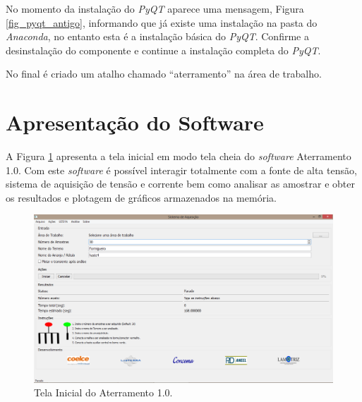 \documentclass[a4paper, 10pt]{article}
\begin{document}
No momento da instalação do \textit{PyQT} aparece uma mensagem, Figura \ref{fig_pyqt_antigo},  informando que 
já existe uma instalação na pasta do \textit{Anaconda}, no entanto esta é a instalação básica do \textit{PyQT}. 
Confirme a desinstalação do componente e continue a instalação completa do \textit{PyQT}.



No final é criado um atalho chamado ``aterramento'' na área de trabalho.


\section{Apresentação do Software}

A Figura \ref{fig_tela_inicial} apresenta a tela inicial em modo tela cheia do \textit{software} Aterramento 1.0. 
Com este \textit{software} é possível interagir totalmente com a fonte de alta tensão, sistema de aquisição de 
tensão e corrente bem como analisar as amostrar e obter os resultados e plotagem de 
gráficos armazenados na memória.

\begin{figure}[!h]
    \caption{\label{fig_tela_inicial}Tela Inicial do Aterramento 1.0.}
	    \begin{center}
            \includegraphics[scale=0.3]{../fotos/execucao/tela_inicial.png}
	    \end{center}
\end{figure}
\end{document}
